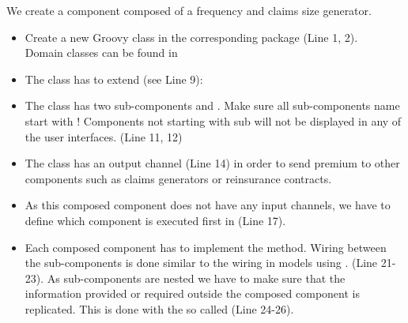 We create a component composed of a frequency and claims size generator.

\begin{itemize}
  \item Create a new Groovy class in the corresponding package (Line 1, 2). \\ Domain classes can be found in 
    \\ 
  \item The class has to extend (see Line 9):
    \\ 
  \item The class has two sub-components  and . Make sure all sub-components name start with ! Components not starting with sub will not be displayed in any of the user interfaces. (Line 11, 12)
  \item The class has an output channel  (Line 14) in order to send premium to other components such as claims generators or reinsurance contracts.
  \item As this composed component does not have any input channels, we have to define which component is executed first in  (Line 17).
    \\ 
  \item Each composed component has to implement the  method. Wiring between the sub-components is done similar to the wiring in models using . (Line 21-23). As sub-components are nested we have to make sure that the information provided or required outside the composed component is replicated. This is done with the so called  (Line 24-26).
    \\ 
\end{itemize}

